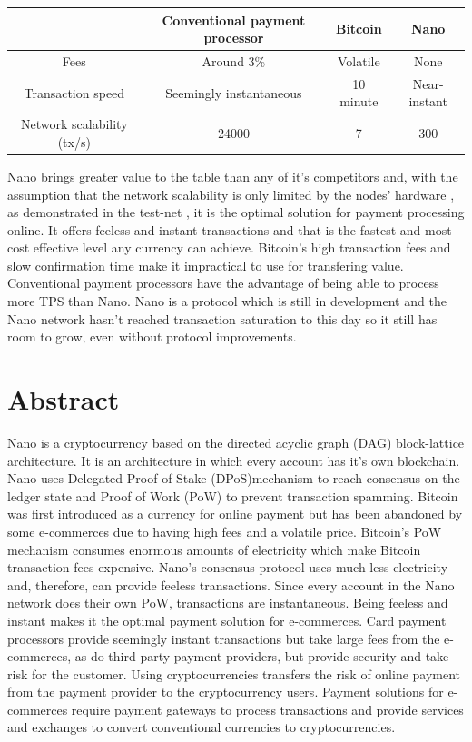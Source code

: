\documentclass{ferseminar}
\begin{document}
\begin{center}
	\begin{tabular}{ |c||c|c|c| }
		\hline
		& Conventional payment processor & Bitcoin & Nano\\ 
		\hline\hline
		Fees & Around 3\% & Volatile & None\\  
		\hline
		Transaction speed & Seemingly instantaneous & 10 minute & Near-instant\\
		\hline
		Network scalability (tx/s) & 24000 & 7 & 300\\
		\hline
	\end{tabular}
\end{center}

Nano brings greater value to the table than any of it's competitors and, with the assumption that the network scalability is only limited by the nodes' hardware \cite{Nano}, as demonstrated in the test-net \cite{github}, it is the optimal solution for payment processing online. It offers feeless and instant transactions and that is the fastest and most cost effective level any currency can achieve.
Bitcoin's high transaction fees and slow confirmation time make it impractical to use for transfering value. 
Conventional payment processors have the advantage of being able to process more TPS than Nano. Nano is a protocol which is still in development and the Nano network hasn't reached transaction saturation to this day so it still has room to grow, even without protocol improvements. 
\section{Abstract}
Nano is a cryptocurrency based on the directed acyclic graph (DAG) block-lattice architecture. It is an architecture in which every account has it's own blockchain. Nano uses Delegated Proof of Stake (DPoS)mechanism to reach consensus on the ledger state and Proof of Work (PoW) to prevent transaction spamming. Bitcoin was first introduced as a currency for online payment but has been abandoned by some e-commerces due to having high fees and a volatile price. Bitcoin's PoW mechanism consumes enormous amounts of electricity which make Bitcoin transaction fees expensive. Nano's consensus protocol uses much less electricity and, therefore, can provide feeless transactions. Since every account in the Nano network does their own PoW, transactions are instantaneous. Being feeless and instant makes it the optimal payment solution for e-commerces. Card payment processors provide seemingly instant transactions but take large fees from the e-commerces, as do third-party payment providers, but provide security and take risk for the customer. Using cryptocurrencies transfers the risk of online payment from the payment provider to the cryptocurrency users. Payment solutions for e-commerces require payment gateways to process transactions and provide services and exchanges to convert conventional currencies to cryptocurrencies.  
\end{document}
